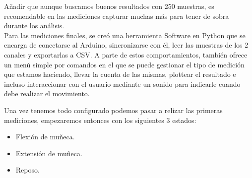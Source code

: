 Añadir que aunque buscamos buenos resultados con 250 muestras, es recomendable en las mediciones capturar muchas más para tener de sobra durante los análisis.\\ 
Para las mediciones finales, se creó una herramienta Software en Python que se encarga de conectarse al Arduino, sincronizarse con él, leer las muestras de los 2 canales y exportarlas a CSV. A parte de estos comportamientos, también ofrece un menú simple por comandos en el que se puede gestionar el tipo de medición que estamos haciendo, llevar la cuenta de las mismas, plottear el resultado e incluso interaccionar con el usuario mediante un sonido para indicarle cuando debe realizar el movimiento.

Una vez tenemos todo configurado podemos pasar a relizar las primeras mediciones, empezaremos entonces con los siguientes 3 estados:

\begin{itemize}
  \item Flexión de muñeca. 
  \item Extensión de muñeca.
  \item Reposo.
\end{itemize}

